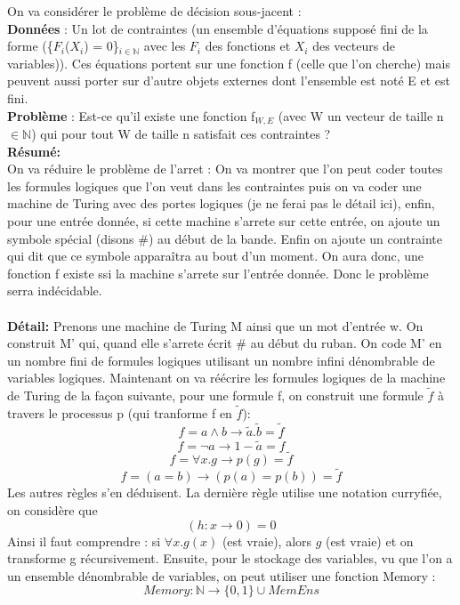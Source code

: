 \documentclass[12pt]{article}
\begin{document}
On va considérer le problème de décision sous-jacent :\\
\textbf{Données} : Un lot de contraintes (un ensemble d'équations supposé fini de la forme (\{$F_i$($X_i$) = 0\}$_{i\in\mathbb{N}}$ avec les $F_i$ des fonctions et $X_i$ des vecteurs de variables)). Ces équations portent sur une fonction f (celle que l'on cherche) mais peuvent aussi porter sur d'autre objets externes dont l'ensemble est noté E et est fini.\\
\textbf{Problème} : Est-ce qu'il existe une fonction f$_{W,E}$ (avec W un vecteur de taille n$\in\mathbb{N}$) qui pour tout W de taille n satisfait ces contraintes ?\\

\textbf{Résumé:}\\
On va réduire le problème de l'arret : On va montrer que l'on peut coder toutes les formules logiques que l'on veut dans les contraintes puis on va coder une machine de Turing avec des portes logiques (je ne ferai pas le détail ici), enfin, pour une entrée donnée, si cette machine s'arrete sur cette entrée, on ajoute un symbole spécial (disons \#) au début de la bande. Enfin on ajoute un contrainte qui dit que ce symbole apparaîtra au bout d'un moment. On aura donc, une fonction f existe ssi la machine s'arrete sur l'entrée donnée. Donc le problème serra indécidable.\\\\
\textbf{Détail:}
Prenons une machine de Turing M ainsi que un mot d'entrée w. On construit M' qui, quand elle s'arrete écrit \# au début du ruban. On code M' en un nombre fini de formules logiques utilisant un nombre infini dénombrable de variables logiques.
Maintenant on va réécrire les formules logiques de la machine de Turing de la façon suivante, pour une formule f, on construit une formule $\widetilde f$ à travers le processus p (qui tranforme f en $\widetilde f$):
\[f = a \wedge b \rightarrow \widetilde a.\widetilde b = \widetilde f \]
\[f = \lnot a \rightarrow 1-\widetilde a = \widetilde f\]
\[f = \forall x.g \rightarrow p(g) = \widetilde f\]
\[f = (a = b) \rightarrow (p(a) = p(b)) = \widetilde f\]
Les autres règles s'en déduisent.
La dernière règle utilise une notation curryfiée, on considère que 
\[(h:x\rightarrow0) = 0\]
Ainsi il faut comprendre : si $\forall x.g(x)$ (est vraie), alors $g$ (est vraie) et on transforme g récursivement. Ensuite, pour le stockage des variables, vu que l'on a un ensemble dénombrable de variables, on peut utiliser une fonction Memory : 
\[Memory : \mathbb{N} \rightarrow \{0,1\}\cup MemEns\]
\end{document}
